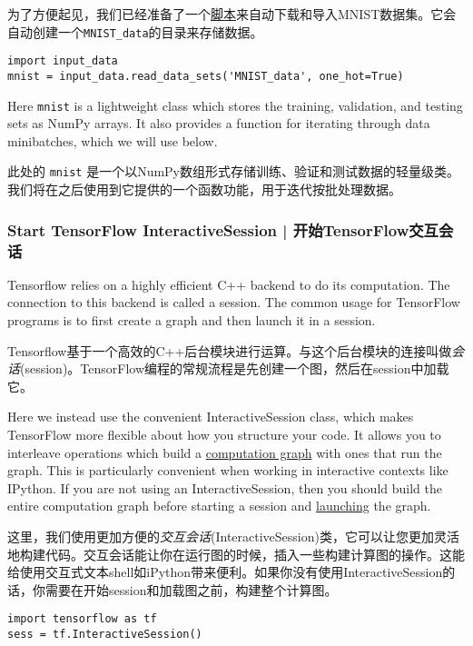 为了方便起见，我们已经准备了一个\href{https://tensorflow.googlesource.com/tensorflow/+/master/tensorflow/examples/tutorials/mnist/input_data.py}{脚本}来自动下载和导入MNIST数据集。它会自动创建一个\lstinline{MNIST_data}的目录来存储数据。

\begin{lstlisting}
import input_data
mnist = input_data.read_data_sets('MNIST_data', one_hot=True)
\end{lstlisting}

Here \lstinline{mnist} is a lightweight class which stores the training, validation, and testing sets as NumPy arrays. It also provides a function for iterating through data minibatches, which we will use below.

此处的 \lstinline{mnist} 是一个以NumPy数组形式存储训练、验证和测试数据的轻量级类。我们将在之后使用到它提供的一个函数功能，用于迭代按批处理数据。

\subsubsection {Start TensorFlow InteractiveSession  |  开始TensorFlow交互会话}

Tensorflow relies on a highly efficient C++ backend to do its computation. The connection to this backend is called a session. The common usage for TensorFlow programs is to first create a graph and then launch it in a session.

Tensorflow基于一个高效的C++后台模块进行运算。与这个后台模块的连接叫做\emph{会话}(session)。TensorFlow编程的常规流程是先创建一个图，然后在session中加载它。

Here we instead use the convenient InteractiveSession class, which makes TensorFlow more flexible about how you structure your code. It allows you to interleave operations which build a \hyperref[computation_graph]{computation graph} with ones that run the graph. This is particularly convenient when working in interactive contexts like IPython. If you are not using an InteractiveSession, then you should build the entire computation graph before starting a session and \hyperref[launching_graph]{launching} the graph.

这里，我们使用更加方便的\emph{交互会话}(InteractiveSession)类，它可以让您更加灵活地构建代码。交互会话能让你在运行图的时候，插入一些构建计算图的操作。这能给使用交互式文本shell如iPython带来便利。如果你没有使用InteractiveSession的话，你需要在开始session和加载图之前，构建整个计算图。

\begin{lstlisting}
import tensorflow as tf
sess = tf.InteractiveSession()
\end{lstlisting}

